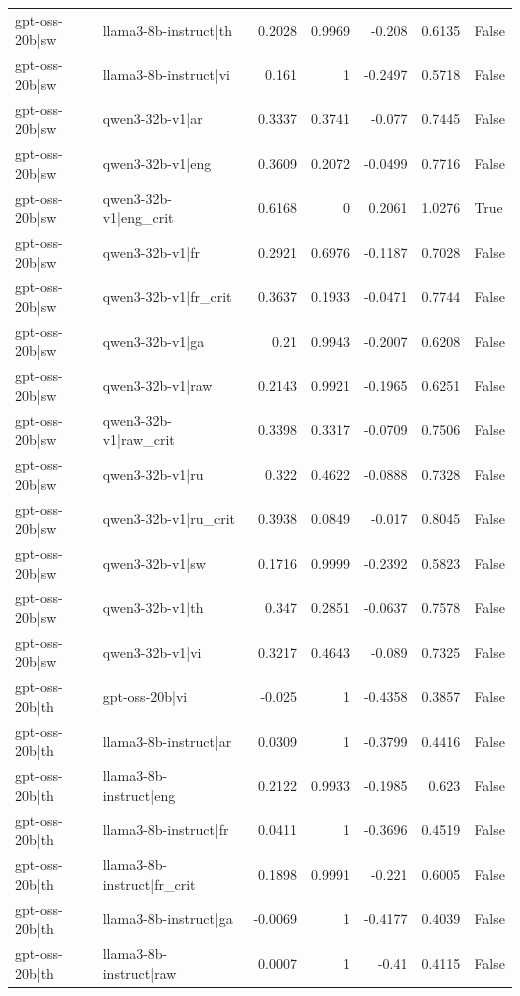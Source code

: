 \begin{table}
\begin{tabular}{l l r r r r l}
gpt-oss-20b|sw & llama3-8b-instruct|th & 0.2028 & 0.9969 & -0.208 & 0.6135 & False \\
gpt-oss-20b|sw & llama3-8b-instruct|vi & 0.161 & 1 & -0.2497 & 0.5718 & False \\
gpt-oss-20b|sw & qwen3-32b-v1|ar & 0.3337 & 0.3741 & -0.077 & 0.7445 & False \\
gpt-oss-20b|sw & qwen3-32b-v1|eng & 0.3609 & 0.2072 & -0.0499 & 0.7716 & False \\
gpt-oss-20b|sw & qwen3-32b-v1|eng_crit & 0.6168 & 0 & 0.2061 & 1.0276 & True \\
gpt-oss-20b|sw & qwen3-32b-v1|fr & 0.2921 & 0.6976 & -0.1187 & 0.7028 & False \\
gpt-oss-20b|sw & qwen3-32b-v1|fr_crit & 0.3637 & 0.1933 & -0.0471 & 0.7744 & False \\
gpt-oss-20b|sw & qwen3-32b-v1|ga & 0.21 & 0.9943 & -0.2007 & 0.6208 & False \\
gpt-oss-20b|sw & qwen3-32b-v1|raw & 0.2143 & 0.9921 & -0.1965 & 0.6251 & False \\
gpt-oss-20b|sw & qwen3-32b-v1|raw_crit & 0.3398 & 0.3317 & -0.0709 & 0.7506 & False \\
gpt-oss-20b|sw & qwen3-32b-v1|ru & 0.322 & 0.4622 & -0.0888 & 0.7328 & False \\
gpt-oss-20b|sw & qwen3-32b-v1|ru_crit & 0.3938 & 0.0849 & -0.017 & 0.8045 & False \\
gpt-oss-20b|sw & qwen3-32b-v1|sw & 0.1716 & 0.9999 & -0.2392 & 0.5823 & False \\
gpt-oss-20b|sw & qwen3-32b-v1|th & 0.347 & 0.2851 & -0.0637 & 0.7578 & False \\
gpt-oss-20b|sw & qwen3-32b-v1|vi & 0.3217 & 0.4643 & -0.089 & 0.7325 & False \\
gpt-oss-20b|th & gpt-oss-20b|vi & -0.025 & 1 & -0.4358 & 0.3857 & False \\
gpt-oss-20b|th & llama3-8b-instruct|ar & 0.0309 & 1 & -0.3799 & 0.4416 & False \\
gpt-oss-20b|th & llama3-8b-instruct|eng & 0.2122 & 0.9933 & -0.1985 & 0.623 & False \\
gpt-oss-20b|th & llama3-8b-instruct|fr & 0.0411 & 1 & -0.3696 & 0.4519 & False \\
gpt-oss-20b|th & llama3-8b-instruct|fr_crit & 0.1898 & 0.9991 & -0.221 & 0.6005 & False \\
gpt-oss-20b|th & llama3-8b-instruct|ga & -0.0069 & 1 & -0.4177 & 0.4039 & False \\
gpt-oss-20b|th & llama3-8b-instruct|raw & 0.0007 & 1 & -0.41 & 0.4115 & False \\

\end{tabular}
\end{table}
